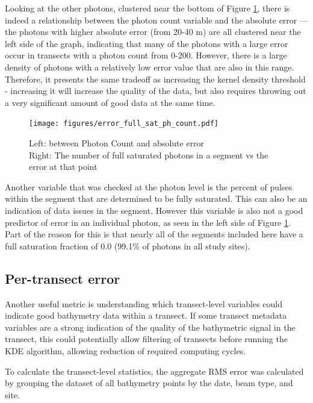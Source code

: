 Looking at the other photons, clustered near the bottom of Figure \ref{fig:error-photon}, there is indeed a relationship between the photon count variable and the absolute error --- the photons with higher absolute error (from 20-40 m) are all clustered near the left side of the graph, indicating that many of the photons with a large error occur in transects with a photon count from 0-200. However, there is a large density of photons with a relatively low error value that are also in this range. Therefore, it presents the same tradeoff as increasing the kernel density threshold - increasing it will increase the quality of the data, but also requires throwing out a very significant amount of good data at the same time.

\begin{figure}[!ht]
    \centering
    \texttt{[image: figures/error\_full\_sat\_ph\_count.pdf]}
    \caption[Photon error vs segment photon count and the fraction of fully-saturated returns in the segment]{Left: between Photon Count and absolute error \\ Right: The number of full saturated photons in a segment vs the error at that point}
    \label{fig:error-photon}
\end{figure}

Another variable that was checked at the photon level is the percent of pulses within the segment that are determined to be fully saturated. This can also be an indication of data issues in the segment. However this variable is also not a good predictor of error in an individual photon, as seen in the left side of Figure \ref{fig:error-photon}. Part of the reason for this is that nearly all of the segments included here have a full saturation fraction of 0.0 (99.1\% of photons in all study sites).

\subsection{Per-transect error}

Another useful metric is understanding which transect-level variables could indicate good bathymetry data within a transect. If some transect metadata variables are a strong indication of the quality of the bathymetric signal in the transect, this could potentially allow filtering of transects before running the KDE algorithm, allowing reduction of required computing cycles.

To calculate the transect-level statistics, the aggregate RMS error was calculated by grouping the dataset of all bathymetry points by the date, beam type, and site.

